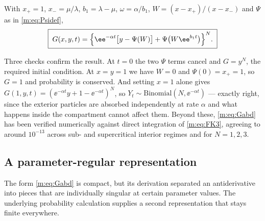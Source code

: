 \begin{proposition}
\label{m:prop:Gabd}
With $x_+=1$, $x_-=\mu/\lambda$, $b_1=\lambda-\mu$, $\omega=\alpha/b_1$,
$W = (x-x_+)/(x-x_-)$ and $\Psi$ as in \cref{m:eq:Psidef},
\begin{equation}
\label{m:eq:Gabd}
\boxed{\;
G(x,y,t) = \Bigl\{\ee^{-\alpha t}\bigl[y-\Psi(W)\bigr] + \Psi\bigl(W\ee^{b_1t}\bigr)\Bigr\}^{N} . \;}
\end{equation}
\end{proposition}

Three checks confirm the result. At $t=0$ the two $\Psi$ terms cancel and $G=y^N$,
the required initial condition. At $x=y=1$ we have $W=0$ and $\Psi(0)=x_+=1$, so
$G=1$ and probability is conserved. And setting $x=1$ alone gives
$G(1,y,t) = (\ee^{-\alpha t}y+1-\ee^{-\alpha t})^N$, so
$Y_t\sim\text{Binomial}(N,\ee^{-\alpha t})$ --- exactly right, since the exterior
particles are absorbed independently at rate $\alpha$ and what happens inside the
compartment cannot affect them. Beyond these, \cref{m:eq:Gabd} has been verified
numerically against direct integration of \cref{m:eq:FK3}, agreeing to around
$10^{-13}$ across sub- and supercritical interior regimes and for $N=1,2,3$.

\subsection{A parameter-regular representation}
\label{m:app:abdregular}

The form \cref{m:eq:Gabd} is compact, but its derivation separated an antiderivative
into pieces that are individually singular at certain parameter values. The
underlying probability calculation supplies a second representation that stays
finite everywhere.


